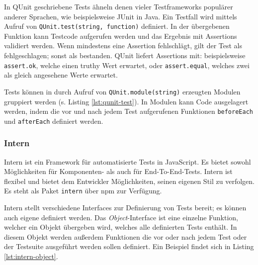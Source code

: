In QUnit geschriebene Tests ähneln denen vieler Testframeworks populärer anderer Sprachen, wie beispielsweise JUnit in Java. Ein Testfall wird mittels Aufruf von \texttt{QUnit.test(string, function)} definiert. In der übergebenen Funktion kann Testcode aufgerufen werden und das Ergebnis mit Assertions validiert werden. Wenn mindestens eine Assertion fehlschlägt, gilt der Test als fehlgeschlagen; sonst als bestanden. QUnit liefert Assertions mit: beispielsweise \texttt{assert.ok}, welche einen truthy Wert erwartet, oder \texttt{assert.equal}, welches zwei als gleich angesehene Werte erwartet.\cite{qunit-cookbook}

Tests können in durch Aufruf von \texttt{QUnit.module(string)} erzeugten Modulen gruppiert werden (s. Listing \ref{lst:qunit-test}). In Modulen kann Code ausgelagert werden, indem die vor und nach jedem Test aufgerufenen Funktionen \texttt{beforeEach} und \texttt{afterEach} definiert werden.\cite{qunit-cookbook}

\begin{figure}[H]
	
\end{figure}

\subsubsection{Intern}
\label{sec:Intern}
Intern ist ein Framework für automatisierte Tests in JavaScript. Es bietet sowohl Möglichkeiten für Komponenten- als auch für End-To-End-Tests. Intern ist flexibel und bietet dem Entwickler Möglichkeiten, seinen eigenen Stil zu verfolgen. Es steht als Paket \texttt{intern} über npm zur Verfügung.\cite{intern-userguide}

Intern stellt verschiedene Interfaces zur Definierung von Tests bereit; es können auch eigene definiert werden. Das \textit{Object}-Interface ist eine einzelne Funktion, welcher ein Objekt übergeben wird, welches alle definierten Tests enthält. In diesem Objekt werden außerdem Funktionen die vor oder nach jedem Test oder der Testsuite ausgeführt werden sollen definiert. Ein Beispiel findet sich in Listing \ref{lst:intern-object}.\cite{intern-userguide}

\begin{figure}[H]
	
\end{figure}

